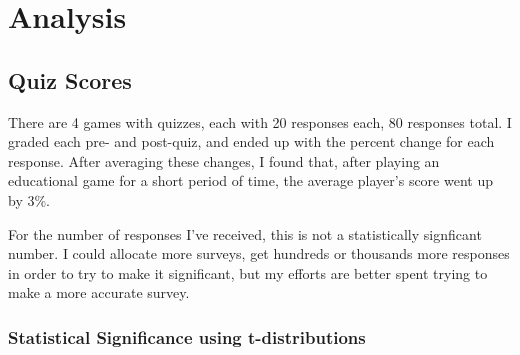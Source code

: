 \section{Analysis}



	\subsection{Quiz Scores}
		There are 4 games with quizzes, each with 20 responses each, 80 responses total. I graded each pre- and post-quiz, and ended up with the percent change for each response. After averaging these changes, I found that, after playing an educational game for a short period of time, the average player's score went up by 3\%.

		For the number of responses I've received, this is not a statistically signficant number. I could allocate more surveys, get hundreds or thousands more responses in order to try to make it significant, but my efforts are better spent trying to make a more accurate survey.

		\subsubsection{Statistical Significance using t-distributions}

